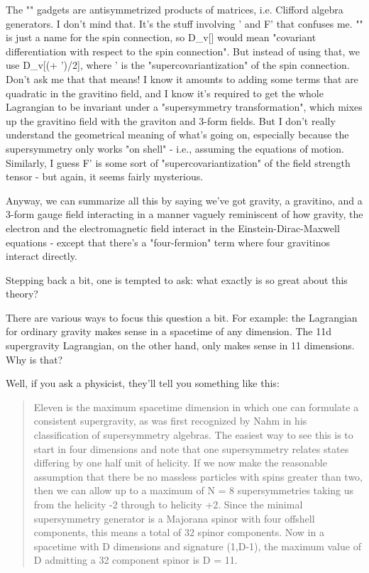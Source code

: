 The "\Gamma " gadgets are antisymmetrized products of \gamma 
matrices, i.e. Clifford algebra generators.  I don't mind that.  It's
the stuff involving \omega ' and F' that confuses me.  "\omega "
is just a name for the spin connection, so D_{v}[\omega ] would mean
"covariant differentiation with respect to the spin
connection".  But instead of using that, we use D_{v}[(\omega  +
\omega ')/2], where \omega ' is the "supercovariantization" of the
spin connection.  Don't ask me that that means!  I know it amounts to
adding some terms that are quadratic in the gravitino field, and I know
it's required to get the whole Lagrangian to be invariant under a
"supersymmetry transformation", which mixes up the gravitino
field with the graviton and 3-form fields.  But I don't really
understand the geometrical meaning of what's going on, especially
because the supersymmetry only works "on shell" - i.e.,
assuming the equations of motion.  Similarly, I guess F' is some sort of
"supercovariantization" of the field strength tensor - but
again, it seems fairly mysterious.
 
Anyway, we can summarize all this by saying we've got gravity, a
gravitino, and a 3-form gauge field interacting in a manner vaguely
reminiscent of how gravity, the electron and the electromagnetic field
interact in the Einstein-Dirac-Maxwell equations - except that there's a
"four-fermion" term where four gravitinos interact directly.

Stepping back a bit, one is tempted to ask: what exactly is so great 
about this theory?   
 
There are various ways to focus this question a bit.  For example: the 
Lagrangian for ordinary gravity makes sense in a spacetime of any 
dimension.  The 11d supergravity Lagrangian, on the other hand, only 
makes sense in 11 dimensions.   Why is that?   
 
Well, if you ask a physicist, they'll tell you something like this: 
 
\begin{quote}
    Eleven is the maximum spacetime dimension in which one can formulate 
    a consistent supergravity, as was first recognized by Nahm in his 
    classification of supersymmetry algebras.  The easiest way to see this 
    is to start in four dimensions and note that one supersymmetry relates 
    states differing by one half unit of helicity.  If we now make the  
    reasonable assumption that there be no massless particles with spins 
    greater than two, then we can allow up to a maximum of N = 8  
    supersymmetries taking us from the helicity -2 through to helicity +2. 
    Since the minimal supersymmetry generator is a Majorana spinor with 
    four offshell components, this means a total of 32 spinor components. 
    Now in a spacetime with D dimensions and signature (1,D-1), the 
    maximum value of D admitting a 32 component spinor is D = 11. 
\end{quote}

